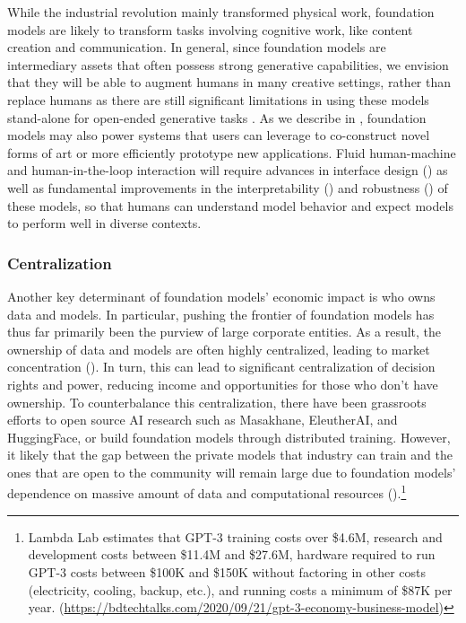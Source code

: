 While the industrial revolution mainly transformed physical work, foundation models are likely to transform tasks involving cognitive work, like content creation and communication. 
In general, since foundation models are intermediary assets that often possess strong generative capabilities, we envision that they will be able to augment humans in many creative settings, rather than replace humans as there are still significant limitations in using these models stand-alone for open-ended generative tasks \citep{see2019}.
As we describe in , foundation models may also power systems that users can leverage to co-construct novel forms of art or more efficiently prototype new applications.
Fluid human-machine and human-in-the-loop interaction will require advances in interface design () as well as fundamental improvements in the interpretability () and robustness () of these models, so that humans can understand model behavior and expect models to perform well in diverse contexts.

\subsubsection{Centralization}
\label{sec:economics-centralization}
Another key determinant of foundation models' economic impact is who owns data and models. 
In particular, pushing the frontier of foundation models has thus far primarily been the purview of large corporate entities. 
As a result, the ownership of data and models are often highly centralized, leading to market concentration (). 
In turn, this can lead to significant centralization of decision rights and power, reducing income and opportunities for those who don't have ownership.
To counterbalance this centralization, there have been grassroots efforts to open source AI research such as Masakhane, EleutherAI, and HuggingFace, or build foundation models through distributed training. 
However, it likely that the gap between the private models that industry can train and the ones that are open to the community will remain large due to foundation models' dependence on massive amount of data and computational resources ().\footnote{Lambda Lab estimates that GPT-3 training costs over \$4.6M, research and development costs between \$11.4M and \$27.6M, hardware required to run GPT-3 costs between \$100K and \$150K without factoring in other costs (electricity, cooling, backup, etc.), and running costs a minimum of \$87K per year. (\url{https://bdtechtalks.com/2020/09/21/gpt-3-economy-business-model})}

